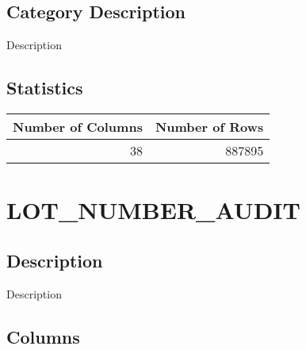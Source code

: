 \documentclass[
  letterpaper,
  DIV=11,
  numbers=noendperiod]{scrreprt}
\begin{document}
\hypertarget{category-description-19}{%
\section*{Category Description}\label{category-description-19}}

Description

\hypertarget{statistics-19}{%
\section*{Statistics}\label{statistics-19}}

\begin{longtable}{rr}
\toprule
Number of Columns & Number of Rows \\ 
\midrule
38 & 887895 \\ 
\bottomrule
\end{longtable}

\hypertarget{lot_number_audit}{%
\chapter*{LOT\_NUMBER\_AUDIT}\label{lot_number_audit}}

\hypertarget{description-20}{%
\section*{Description}\label{description-20}}

Description

\hypertarget{columns-20}{%
\section*{Columns}\label{columns-20}}
\end{document}
